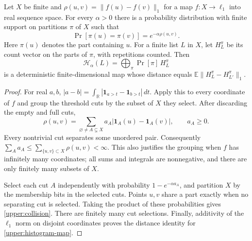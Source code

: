 \begin{lemma}\label{upper:partitions}
Let $X$ be finite and
$\rho(u,v)=\|f(u)-f(v)\|_1$ for a map $f:X\to\ell_1$ into real sequence
space.  For every $\alpha>0$ there is a probability distribution with
finite support on partitions $\pi$ of $X$ such that
\begin{equation}\label{upper:collision}
 \Pr[\pi(u)=\pi(v)]=e^{-\alpha\rho(u,v)}.
\end{equation}
Here $\pi(u)$ denotes the part containing $u$.  For a finite list $L$
in $X$, let $H_L^\pi$ be its count vector on the parts of $\pi$, with
repetitions counted.  Then
\begin{equation}\label{upper:histogram-map}
 \mathcal H_\alpha(L)=\bigoplus_\pi \Pr[\pi]\,H_L^\pi
\end{equation}
is a deterministic finite-dimensional map whose distance equals
$\mathbb E\|H_L^\pi-H_{L'}^\pi\|_1$.
\end{lemma}
\begin{proof}
For real $a,b$,
$|a-b|=\int_{\mathbb R}|\mathbf 1_{a>t}-\mathbf 1_{b>t}|\,dt$.
Apply this to every coordinate of $f$ and group the threshold cuts by
the subset of $X$ they select.  After discarding the empty and full cuts,
\[
 \rho(u,v)=\sum_{\varnothing\ne A\subsetneq X}
 a_A|\mathbf 1_A(u)-\mathbf 1_A(v)|,\qquad a_A\ge0.
\]
Every nontrivial cut separates some unordered pair.  Consequently
$\sum_Aa_A\le\sum_{\{u,v\}\subset X}\rho(u,v)<\infty$.
This also justifies the grouping when $f$ has infinitely many coordinates;
all sums and integrals are nonnegative, and there are only finitely many
subsets of $X$.

Select each cut $A$ independently with probability $1-e^{-\alpha a_A}$,
and partition $X$ by the membership bits in the selected cuts.  Points
$u,v$ share a part exactly when no separating cut is selected.  Taking
the product of these probabilities gives \eqref{upper:collision}.
There are finitely many cut selections.  Finally, additivity of the
$\ell_1$ norm on disjoint coordinates proves the distance identity for
\eqref{upper:histogram-map}.
\end{proof}


